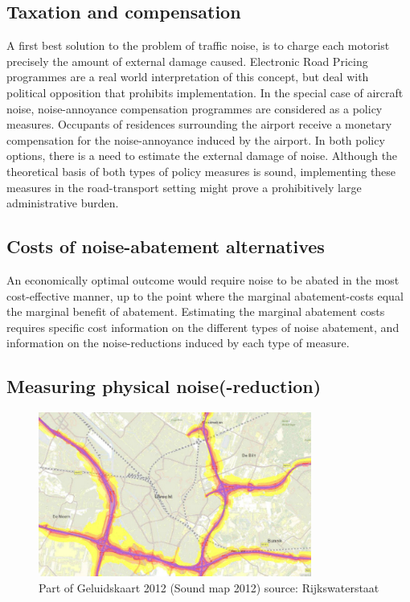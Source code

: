 \documentclass[a4paper]{scrartcl}
\begin{document}
\subsection{Taxation and compensation}

A first best solution to the problem of traffic noise, is to charge each motorist precisely the amount of external damage caused. Electronic Road Pricing programmes are a real world interpretation of this concept, but deal with political opposition that prohibits implementation. In the special case of aircraft noise, noise-annoyance compensation programmes are considered as a policy measures. Occupants of residences surrounding the airport receive a monetary compensation for the noise-annoyance induced by the airport. In both policy options, there is a need to estimate the external damage of noise. Although the theoretical basis of both types of policy measures is sound, implementing these measures in the road-transport setting might prove a prohibitively large administrative burden.

\subsection{Costs of noise-abatement alternatives}

An economically optimal outcome would require noise to be abated in the most cost-effective manner, up to the point where the marginal abatement-costs equal the marginal benefit of abatement. Estimating the marginal abatement costs requires specific cost information on the different types of noise abatement, and information on the noise-reductions induced by each type of measure. 

\subsection{Measuring physical noise(-reduction)}

\begin{figure}[h]
	\label{Geluidskaart}
	\caption{Part of Geluidskaart 2012 (Sound map 2012) source: Rijkswaterstaat}
	\centering
	\includegraphics[width=0.8\textwidth]{Geluidskaart}
\end{figure}
\end{document}
